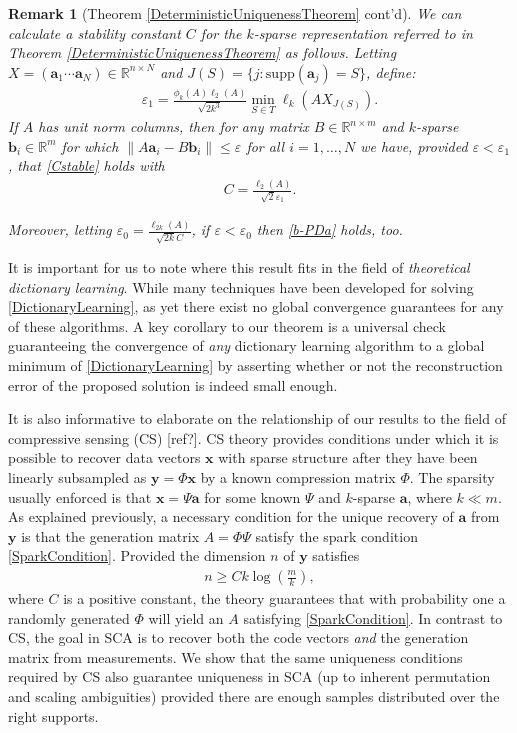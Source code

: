 \documentclass[journal, onecolumn]{IEEEtran}
\newtheorem{remark}{Remark}
\begin{document}
\begin{remark}[Theorem \ref{DeterministicUniquenessTheorem} cont'd]\label{thm1specs}
We can calculate a stability constant $C$ for the $k$-sparse representation referred to in Theorem \ref{DeterministicUniquenessTheorem} as follows. Letting $X  = (\mathbf{a}_1 \cdots \mathbf{a}_N) \in \mathbb{R}^{n \times N}$ and $J(S) = \{j : \text{supp}(\mathbf{a}_j) = S\}$, define:
\begin{align}\label{epsilon0}
\varepsilon_1 = \frac{ \phi_k(A) \ell_2(A) }{\sqrt{2k^3} } \min_{S \in T} \ell_k(AX_{J(S)}).
\end{align}
If $A$ has unit norm columns, then for any matrix $B \in \mathbb{R}^{n \times m}$ and $k$-sparse $\mathbf{b}_i \in \mathbb{R}^m$ for which $\|A\mathbf{a}_i - B\mathbf{b}_i\| \leq \varepsilon$ for all $i = 1, \ldots, N$ we have, provided $\varepsilon < \varepsilon_1$, that \eqref{Cstable} holds with
\begin{align}\label{Cdef}
C = \frac{\ell_2(A)}{\sqrt{2} \varepsilon_1}.
\end{align}

Moreover, letting $\varepsilon_0 = \frac{\ell_{2k}(A)}{\sqrt{2k}C}$, if $\varepsilon < \varepsilon_0$ then \eqref{b-PDa} holds, too.
\end{remark}

It is important for us to note where this result fits in the field of \emph{theoretical dictionary learning}. While many techniques have been developed for solving \eqref{DictionaryLearning}, as yet there exist no global convergence guarantees for any of these algorithms. A key corollary to our theorem is a universal check guaranteeing the convergence of \emph{any} dictionary learning algorithm to a global minimum of \eqref{DictionaryLearning} by asserting whether or not the reconstruction error of the proposed solution is indeed small enough. 

It is also informative to elaborate on the relationship of our results to the field of compressive sensing (CS) [ref?]. CS theory provides conditions under which it is possible to recover data vectors $\mathbf{x}$ with sparse structure after they have been linearly subsampled as $\mathbf{y} = \Phi \mathbf{x}$ by a known compression matrix $\Phi$. The sparsity usually enforced is that $\mathbf{x} = \Psi\mathbf{a}$ for some known $\Psi$ and $k$-sparse $\mathbf{a}$, where $k \ll m$. As explained previously, a necessary condition for the unique recovery of $\mathbf{a}$ from $\mathbf{y}$ is that the generation matrix $A = \Phi\Psi$ satisfy the spark condition \eqref{SparkCondition}. Provided the dimension $n$ of $\mathbf{y}$ satisfies
\begin{align}\label{CScondition}
n \geq Ck\log\left(\frac{m}{k}\right),
\end{align}
%
where $C$ is a positive constant, the theory guarantees that with probability one a randomly generated $\Phi$ will yield an $A$ satisfying \eqref{SparkCondition}. In contrast to CS, the goal in SCA is to recover both the code vectors \emph{and} the generation matrix from measurements. We show that the same uniqueness conditions required by CS also guarantee uniqueness in SCA (up to inherent permutation and scaling ambiguities) provided there are enough samples distributed over the right supports.
\end{document}
